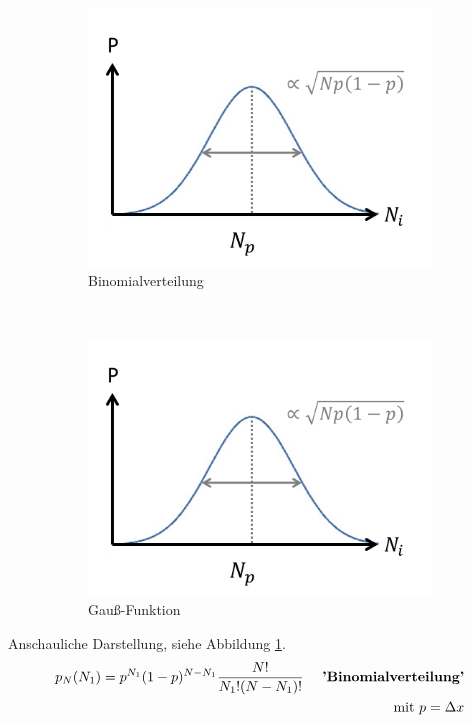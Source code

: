 \documentclass[12pt]{article}
\begin{document}
\begin{enumerate}
\begin{itemize}
\begin{figure}[h] %
		\begin{subfigure}[h]{0.5 \textwidth}
		\centering
		\includegraphics[width=\textwidth]{Folie12.png}
		\caption{Binomialverteilung} 
		\label{fig:Binomialverteilung}
		\centering
	\end{subfigure}
	~
	\begin{subfigure}[h]{0.5\textwidth}
		\centering
		\includegraphics[width=\textwidth]{Folie12.png}
		\caption{Gauß-Funktion} 
		\label{fig:Gaussfunktion}
		\centering
	\end{subfigure}
	\caption{ }
\end{figure}
Anschauliche Darstellung, siehe Abbildung \ref{fig:Binomialverteilung}.
\begin{align}
p_N (N_1) = p^{N_1} (1-p)^{N-N_1} \frac{N!}{N_1 ! (N-N_1)!} \quad  \mbox{ \textbf{'Binomialverteilung'}} \\
 \mbox{ mit } p= \Delta x
\end{align}


\end{itemize}
\end{enumerate}
\end{document}
